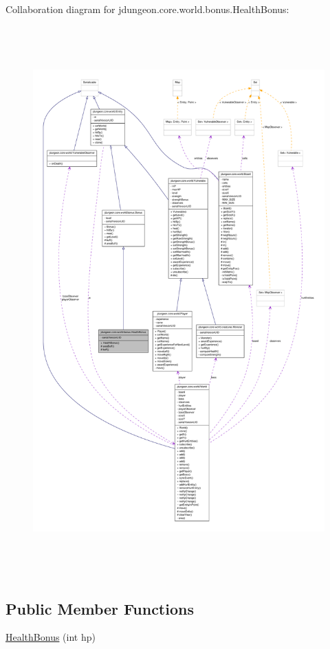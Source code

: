 Collaboration diagram for jdungeon.core.world.bonus.HealthBonus:
\nopagebreak
\begin{figure}[H]
\begin{center}
\leavevmode
\includegraphics[height=600pt]{classjdungeon_1_1core_1_1world_1_1bonus_1_1_health_bonus__coll__graph}
\end{center}
\end{figure}
\subsection*{Public Member Functions}
\begin{DoxyCompactItemize}
\item 
\hyperlink{classjdungeon_1_1core_1_1world_1_1bonus_1_1_health_bonus_a3bb243b25fb0a5e7ea9763fa0e0f3f13}{HealthBonus} (int hp)
\end{DoxyCompactItemize}
